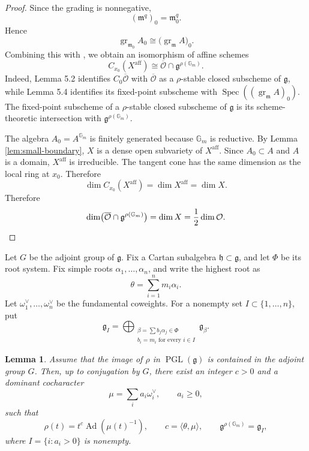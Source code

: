 \documentclass[12pt]{article}
\newtheorem{lemma}[theorem]{Lemma}
\theoremstyle{remark}
\theoremstyle{plain}
\DeclareMathOperator{\Spec}{Spec}
\DeclareMathOperator{\Ad}{Ad}
\newcommand{\Gm}{\mathbb G_m}
\newcommand{\aff}{\mathrm{aff}}
\begin{document}
\begin{proof}
Since the grading is nonnegative,
\[
(\mathfrak m^q)_0=\mathfrak m_0^q.
\]
Hence
\[
\operatorname{gr}_{\mathfrak m_0}A_0
\cong
\bigl(\operatorname{gr}_{\mathfrak m}A\bigr)_0.
\]
Combining this with \cite[Lemmas 5.2 and 5.4]{Jia}, we obtain an
isomorphism of affine schemes
\[
C_{x_0}(X^{\aff})
\cong
\overline{\mathcal O}\cap
\mathfrak g^{\rho(\Gm)}.
\]
Indeed, Lemma 5.2 identifies $C_0\overline{\mathcal O}$ with
$\overline{\mathcal O}$ as a $\rho$-stable closed subscheme of
$\mathfrak g$, while Lemma 5.4 identifies its fixed-point subscheme
with $\Spec((\operatorname{gr}_{\mathfrak m}A)_0)$.
The fixed-point subscheme of a $\rho$-stable closed subscheme of
$\mathfrak g$ is its scheme-theoretic intersection with
$\mathfrak g^{\rho(\Gm)}$.

The algebra $A_0=A^{\Gm}$ is finitely generated because $\Gm$ is
reductive. By Lemma \ref{lem:small-boundary}, $X$ is a dense open
subvariety of $X^{\aff}$. Since $A_0\subset A$ and $A$ is a domain,
$X^{\aff}$ is irreducible. The tangent cone has the same dimension as
the local ring at $x_0$. Therefore
\[
\dim C_{x_0}(X^{\aff})
=\dim X^{\aff}
=\dim X.
\]
Therefore
\[
\dim\bigl(\overline{\mathcal O}\cap\mathfrak g^{\rho(\Gm)}\bigr)
=\dim X
=\frac12\dim\mathcal O.
\qedhere
\]
\end{proof}

Let $G$ be the adjoint group of $\mathfrak g$. Fix a Cartan subalgebra
$\mathfrak h\subset\mathfrak g$, and let $\Phi$ be its root system.
Fix simple roots $\alpha_1,\ldots,\alpha_n$, and write the highest root as
\[
\theta=\sum_{i=1}^n m_i\alpha_i.
\]
Let $\omega_1^\vee,\ldots,\omega_n^\vee$ be the fundamental
coweights. For a nonempty set $I\subset\{1,\ldots,n\}$, put
\[
\mathfrak g_I=
\bigoplus_{\substack{\beta=\sum b_j\alpha_j\in\Phi\\
b_i=m_i\text{ for every }i\in I}}
\mathfrak g_\beta.
\]

\begin{lemma}\label{lem:top-root}
Assume that the image of $\rho$ in
$\operatorname{PGL}(\mathfrak g)$ is contained in the adjoint group
$G$.
Then, up to conjugation by $G$, there exist an integer $c>0$ and a
dominant cocharacter
\[
\mu=\sum_i a_i\omega_i^\vee,
\qquad a_i\geq0,
\]
such that
\[
\rho(t)=t^c\Ad(\mu(t)^{-1}),
\qquad
c=\langle\theta,\mu\rangle,
\qquad
\mathfrak g^{\rho(\Gm)}=\mathfrak g_I,
\]
where $I=\{i:a_i>0\}$ is nonempty.
\end{lemma}
\end{document}

